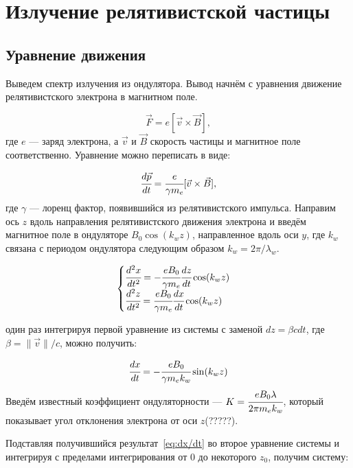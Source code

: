 \documentclass[14pt,a4paper]{extarticle}
\numberwithin{equation}{section}
\begin{document}
\section{Излучение релятивистской частицы}
\subsection{Уравнение движения}
Выведем спектр излучения из ондулятора. Вывод начнём с уравнения движение релятивистского электрона в магнитном поле.

\begin{equation}
	\vec{F} = e[\vec{v} \times \vec{B}],
\end{equation} 
где $e$ --- заряд электрона, а $\vec{v}$ и $\vec{B}$ скорость частицы и магнитное поле соответственно. Уравнение можно переписать в виде:

\begin{equation}
	\cfrac{d\vec{p}}{dt} = \cfrac{e}{\gamma m_e}[\vec{v} \times \vec{B}],
\end{equation}
где $\gamma$ --- лоренц фактор, появившийся из релятивистского импульса. Направим ось $z$ вдоль направления релятивистского движения электрона и введём магнитное поле в ондуляторе $B_0\cos(k_w z)$, направленное вдоль оси $y$, где $k_w$ связана с периодом ондулятора следующим образом $k_w = 2\pi/\lambda_w$. 

\begin{equation}
	\begin{cases}
		\cfrac{d^2 x}{dt^2} = - \cfrac{e B_0}{\gamma m_e}\cfrac{dz}{dt} \cos(k_w z)\\
		\cfrac{d^2 z}{dt^2} = \cfrac{e B_0}{\gamma m_e}\cfrac{dx}{dt} \cos(k_w z)
	\end{cases} 
\end{equation}

один раз интегрируя первой уравнение из системы с заменой $dz = \beta cdt$, где $\beta = \|\vec{v}\| /c$, можно получить: 

\begin{equation}
 	\label{eq:dx/dt}
	\cfrac{dx}{dt} = - \cfrac{eB_0}{\gamma m_ek_w} \sin(k_w z)
\end{equation}
Введём известный коэффициент ондуляторности --- $K = \cfrac{eB_0 \lambda}{2\pi m_ek_w}$, который показывает угол отклонения электрона от оси $z$(?????). 

Подставляя получившийся результат~\ref{eq:dx/dt} во второе уравнение системы и интегрируя с пределами интегрирования от $0$ до некоторого $z_0$, получим систему:
\end{document}
